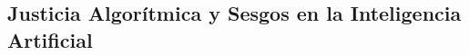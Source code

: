 \begin{refsection}
\chapter{Justicia Algorítmica y Sesgos en la Inteligencia Artificial}
\label{chapter:chapter-4}


\begin{comment}
\begin{enumerate}
\item \textbf{Justicia Algorítmica y Sesgos en la Inteligencia Artificial (Capítulo 4):}  
\begin{itemize}
    \item Contexto de los sesgos algorítmicos y sus impactos en justicia, educación y salud.
    \item Métodos para detectar y mitigar sesgos con herramientas como \texttt{Fairlearn}.
    \item Integración de interpretabilidad para garantizar transparencia en decisiones algorítmicas.
    \item Actividad: Implementar un pipeline de mitigación de sesgos en un modelo de clasificación con Python.
\end{itemize}
\end{enumerate}
\end{comment}



\nocite{*}

\printbibliography[heading=subbibliography, title={Bibliografía del Capítulo 4}]
\end{refsection}


